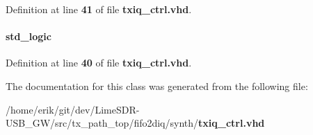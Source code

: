 Definition at line {\bf 41} of file {\bf txiq\+\_\+ctrl.\+vhd}.

\paragraph[{txiq\+\_\+en\+\_\+mux}]{ {\bfseries \textcolor{comment}{std\+\_\+logic}\textcolor{vhdlchar}{ }} \hspace{0.3cm}{\ttfamily [Signal]}}\label{classtxiq__ctrl_1_1arch_a3ed49ada4e90e142b18daf0b58662754}


Definition at line {\bf 40} of file {\bf txiq\+\_\+ctrl.\+vhd}.



The documentation for this class was generated from the following file\+:\begin{DoxyCompactItemize}
\item 
/home/erik/git/dev/\+Lime\+S\+D\+R-\/\+U\+S\+B\+\_\+\+G\+W/src/tx\+\_\+path\+\_\+top/fifo2diq/synth/{\bf txiq\+\_\+ctrl.\+vhd}\end{DoxyCompactItemize}
